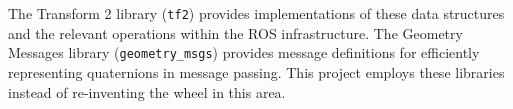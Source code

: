 




The Transform 2 library (\texttt{tf2}) provides implementations of these data structures and the relevant operations within the ROS infrastructure. The Geometry Messages library (\texttt{geometry\_msgs}) provides message definitions for efficiently representing quaternions in message passing. This project employs these libraries instead of re-inventing the wheel in this area.